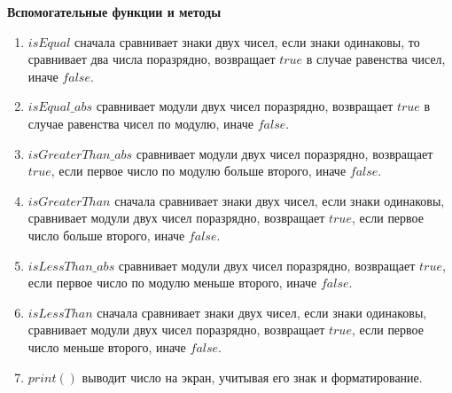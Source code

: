 \documentclass[12pt, a4paper]{article}
\begin{document}
\textbf{Вспомогательные функции и методы}
\begin{enumerate}
	\item $isEqual$ сначала сравнивает знаки двух чисел, если знаки 
	одинаковы, то сравнивает два числа поразрядно, возвращает $true$ в 
	случае равенства чисел, иначе $false$.
	\item $isEqual\_abs$ сравнивает модули двух чисел поразрядно, 
	возвращает $true$ в случае равенства чисел по модулю, иначе $false$.
	\item $isGreaterThan\_abs$ сравнивает модули двух чисел поразрядно, 
	возвращает $true$, если первое число по модулю больше второго, иначе 
	$false$.
	\item $isGreaterThan$ сначала сравнивает знаки двух чисел, если 
	знаки одинаковы, сравнивает модули двух чисел поразрядно, 
	возвращает $true$, если первое число больше второго, иначе $false$.
	\item $isLessThan\_abs$ сравнивает модули двух чисел поразрядно, 
	возвращает $true$, если первое число по модулю меньше второго, иначе 
	$false$.
	\item $isLessThan$ сначала сравнивает знаки двух чисел, если 
	знаки одинаковы, сравнивает модули двух чисел поразрядно, 
	возвращает $true$, если первое число меньше второго, иначе $false$.
	\item $print()$ выводит число на экран, учитывая его знак и 
	форматирование.
\end{enumerate}
\newpage
\end{document}
